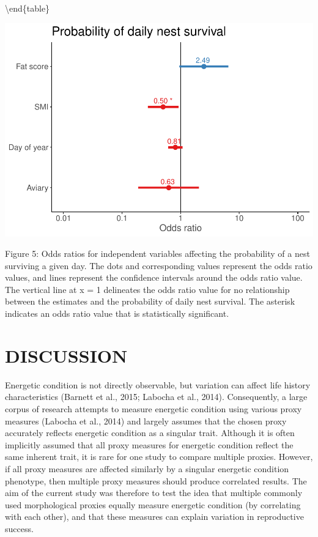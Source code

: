 \documentclass[
]{article}
\begin{document}
\textbackslash end\{table\}

\includegraphics{gcondition_files/figure-latex/logexp-1.pdf}

Figure 5: Odds ratios for independent variables affecting the
probability of a nest surviving a given day. The dots and corresponding
values represent the odds ratio values, and lines represent the
confidence intervals around the odds ratio value. The vertical line at x
= 1 delineates the odds ratio value for no relationship between the
estimates and the probability of daily nest survival. The asterisk
indicates an odds ratio value that is statistically significant.

\hypertarget{discussion}{%
\section{DISCUSSION}\label{discussion}}

Energetic condition is not directly observable, but variation can affect
life history characteristics (Barnett et al., 2015; Labocha et al.,
2014). Consequently, a large corpus of research attempts to measure
energetic condition using various proxy measures (Labocha et al., 2014)
and largely assumes that the chosen proxy accurately reflects energetic
condition as a singular trait. Although it is often implicitly assumed
that all proxy measures for energetic condition reflect the same
inherent trait, it is rare for one study to compare multiple proxies.
However, if all proxy measures are affected similarly by a singular
energetic condition phenotype, then multiple proxy measures should
produce correlated results. The aim of the current study was therefore
to test the idea that multiple commonly used morphological proxies
equally measure energetic condition (by correlating with each other),
and that these measures can explain variation in reproductive success.
\end{document}
